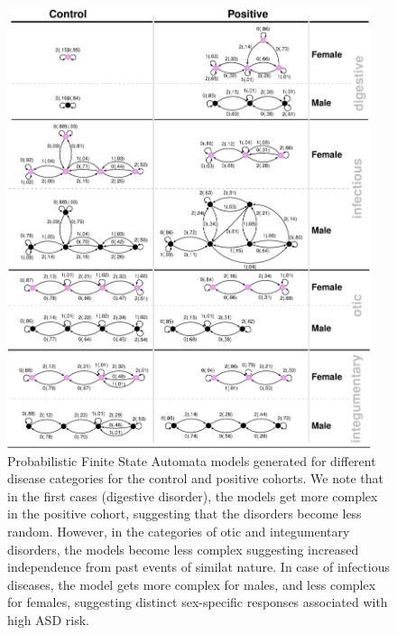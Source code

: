 \documentclass[3p,super,numbers,sort&compress,preprint,10pt]{elsarticle}
\renewcommand{\captionN}[1]{\caption{\color{CadetBlue4!80!black} \sffamily \fontsize{9}{10}\selectfont #1  }}
\newif\iftikzX
\gdef\treatment{positive\xspace}
\begin{document}
\begin{figure}[!t]
  \tikzexternalenable
  \centering  
  \vspace{-10pt}
  
 \def\DATA{../../data_latest}
\iftikzX

\else
  \includegraphics[width=0.95\textwidth]{Figures/External/pfsa}
  \fi
      \vspace{-5pt}

     \captionN{Probabilistic Finite State Automata models generated for different disease categories for the control and \treatment cohorts. We note that in the first  cases (digestive disorder), the models get more complex in the \treatment cohort, suggesting that the disorders become less random. However, in the categories of otic and integumentary disorders, the models become less complex suggesting increased independence from past events of similat nature. In case of infectious diseases, the model gets more complex for males, and less complex for females, suggesting distinct sex-specific responses associated with high ASD risk.}\label{EXT-autgrid}
\end{figure}
\else
{}\label{EXT-autgrid}
\fi
\end{document}

